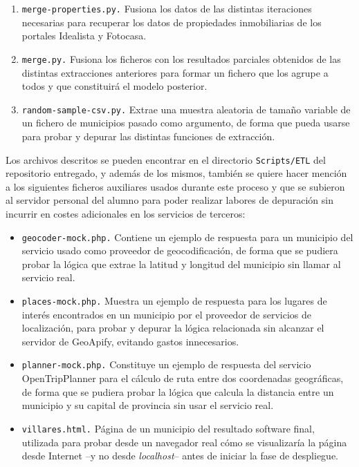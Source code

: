 \begin{enumerate}
    
    \item \texttt{merge-properties.py.} Fusiona los datos de las distintas iteraciones necesarias para recuperar los datos de propiedades inmobiliarias de los portales Idealista y Fotocasa.
    
    \item \texttt{merge.py.} Fusiona los ficheros con los resultados parciales obtenidos de las distintas extracciones anteriores para formar un fichero que los agrupe a todos y que constituirá el modelo posterior.
    
    \item \texttt{random-sample-csv.py.} Extrae una muestra aleatoria de tamaño variable de un fichero de municipios pasado como argumento, de forma que pueda usarse para probar y depurar las distintas funciones de extracción.
\end{enumerate}

Los archivos descritos se pueden encontrar en el directorio \texttt{Scripts/ETL} del repositorio entregado, y además de los mismos, también se quiere hacer mención a los siguientes ficheros auxiliares usados durante este proceso y que se subieron al servidor personal del alumno para poder realizar labores de depuración sin incurrir en costes adicionales en los servicios de terceros:

\begin{itemize}
    \item \texttt{geocoder-mock.php.} Contiene un ejemplo de respuesta para un municipio del servicio usado como proveedor de geocodificación, de forma que se pudiera probar la lógica que extrae la latitud y longitud del municipio sin llamar al servicio real.
    \item \texttt{places-mock.php.} Muestra un ejemplo de respuesta para los lugares de interés encontrados en un municipio por el proveedor de servicios de localización, para probar y depurar la lógica relacionada sin alcanzar el servidor de GeoApify, evitando gastos innecesarios.
    \item \texttt{planner-mock.php.} Constituye un ejemplo de respuesta del servicio OpenTripPlanner para el cálculo de ruta entre dos coordenadas geográficas, de forma que se pudiera probar la lógica que calcula la distancia entre un municipio y su capital de provincia sin usar el servicio real.
    \item \texttt{villares.html.} Página de un municipio del resultado software final, utilizada para probar desde un navegador real cómo se visualizaría la página desde Internet –y no desde \textit{localhost}– antes de iniciar la fase de despliegue.
\end{itemize}

